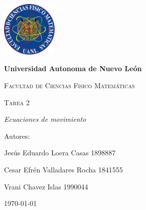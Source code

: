 \begin{titlepage}
    \centering
    {\includegraphics[width=0.2\textwidth]{FCFM.png}\par}
    \vspace{1cm}
    {\bfseries\LARGE Universidad Autonoma de Nuevo León \par}
    \vspace{1cm}
    {\scshape\Large Facultad de Ciencias Físico Matemáticas \par}
    \vspace{3cm}
    {\scshape\Huge Tarea 2  \par}
    \vspace{3cm}
    {\itshape\Large Ecuaciones de movimiento \par}
    \vfill
    {\Large Autores: \par}
    \vfill
    {\Large Jesús Eduardo Loera Casas 1898887 \par}
    \vfill{\Large Cesar Efrén Valladares Rocha 1841555 \par}
    \vfill
    {\Large Vrani Chavez Islas 1990044 \par}
    \vfill
    {\Large \today \par}
\end{titlepage}